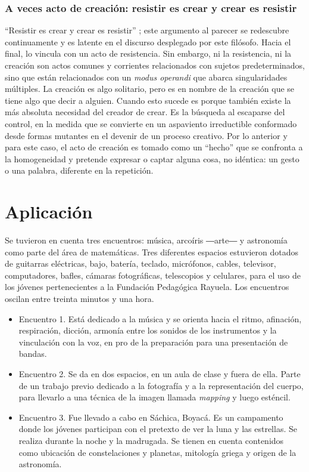 \documentclass{textolivre}
\begin{document}
\subsubsection{A veces acto de creación: resistir es crear y crear es resistir}\label{sec-acto}
“Resistir es crear y crear es resistir” \cite{deleuze_que_2007}; este argumento al parecer se redescubre continuamente y es latente en el discurso desplegado por este filósofo. Hacia el final, lo vincula con un acto de resistencia. Sin embargo, ni la resistencia, ni la creación son actos comunes y corrientes relacionados con sujetos predeterminados, sino que están relacionados con un \textit{modus operandi} que abarca singularidades múltiples. La creación es algo solitario, pero es en nombre de la creación que se tiene algo que decir a alguien. Cuando esto sucede es porque también existe la más absoluta necesidad del creador de crear. Es la búsqueda al escaparse del control, en la medida que se convierte en un aspaviento irreductible conformado desde formas mutantes en el devenir de un proceso creativo. Por lo anterior y para este caso, el acto de creación es tomado como un “hecho” que se confronta a la homogeneidad y pretende expresar o captar alguna cosa, no idéntica: un gesto o una palabra, diferente en la repetición.

\section{Aplicación}\label{sec-aplicacion}
Se tuvieron en cuenta tres encuentros: música, arcoíris ―arte― y astronomía como parte del área de matemáticas. Tres diferentes espacios estuvieron dotados de guitarras eléctricas, bajo, batería, teclado, micrófonos, cables, televisor, computadores, bafles, cámaras fotográficas, telescopios y celulares, para el uso de los jóvenes pertenecientes a la Fundación Pedagógica Rayuela. Los encuentros oscilan entre treinta minutos y una hora.

\begin{itemize}
    \item Encuentro 1. Está dedicado a la música y se orienta hacia el ritmo, afinación, respiración, dicción, armonía entre los sonidos de los instrumentos y la vinculación con la voz, en pro de la preparación para una presentación de bandas. 
    \item Encuentro 2. Se da en dos espacios, en un aula de clase y fuera de ella. Parte de un trabajo previo dedicado a la fotografía y a la representación del cuerpo, para llevarlo a una técnica de la imagen llamada \textit{mapping} y luego esténcil. 
    \item Encuentro 3. Fue llevado a cabo en Sáchica, Boyacá. Es un campamento donde los jóvenes participan con el pretexto de ver la luna y las estrellas. Se realiza durante la noche y la madrugada. Se tienen en cuenta contenidos como ubicación de constelaciones y planetas, mitología griega y origen de la astronomía.
\end{itemize}
\end{document}
